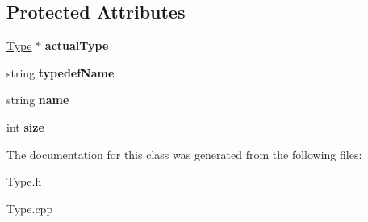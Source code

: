 \subsection*{Protected Attributes}
\begin{DoxyCompactItemize}
\item 
\hypertarget{classTypedefType_a57b2b8004189b045d512db0aeb69d20e}{\hyperlink{classType}{Type} $\ast$ {\bfseries actual\-Type}}\label{classTypedefType_a57b2b8004189b045d512db0aeb69d20e}

\item 
\hypertarget{classTypedefType_ac0715bb8e179353e9740fca6245ae0d6}{string {\bfseries typedef\-Name}}\label{classTypedefType_ac0715bb8e179353e9740fca6245ae0d6}

\item 
\hypertarget{classType_ad7eeefba3dfcecbdaa98d46aaa84e389}{string {\bfseries name}}\label{classType_ad7eeefba3dfcecbdaa98d46aaa84e389}

\item 
\hypertarget{classType_a871302dc63ac1a37c0b6a225cf82048d}{int {\bfseries size}}\label{classType_a871302dc63ac1a37c0b6a225cf82048d}

\end{DoxyCompactItemize}


The documentation for this class was generated from the following files\-:\begin{DoxyCompactItemize}
\item 
Type.\-h\item 
Type.\-cpp\end{DoxyCompactItemize}
